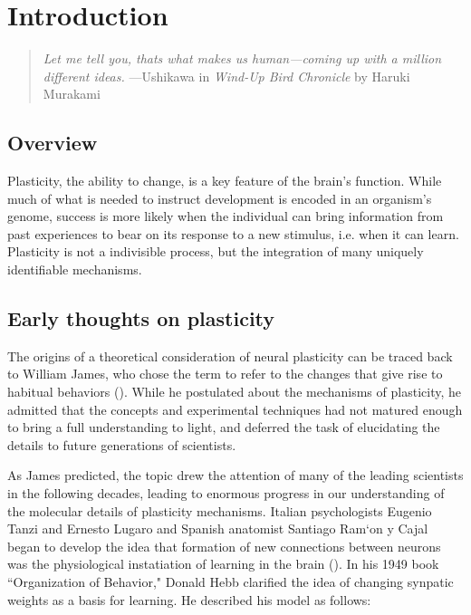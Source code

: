 \chapter{Introduction}

\begin{quotation}
\textit{Let me tell you, thats what makes us human---coming up with a million \mbox{different} ideas.}
\newline{}
\newline{}
 ---Ushikawa in \textit{Wind-Up Bird Chronicle} by Haruki Murakami
\end{quotation}

\section{Overview}

Plasticity, the ability to change, is a key feature of the brain's function. While much of what is needed to instruct development is encoded in an organism's genome, success is more likely when the individual can bring information from past experiences to bear on its response to a new stimulus, i.e. when it can learn. Plasticity is not a indivisible process, but the integration of many uniquely identifiable mechanisms.

\section{Early thoughts on plasticity}
The origins of a theoretical consideration of neural plasticity can be traced back to William James, who chose the term to refer to the changes that give rise to habitual behaviors (\cite{James1910, Berlucchi2009}). While he postulated about the mechanisms of plasticity, he admitted that the concepts and experimental techniques had not matured enough to bring a full understanding to light, and deferred the task of elucidating the details to future generations of scientists.

As James predicted, the topic drew the attention of many of the leading scientists in the following decades, leading to enormous progress in our understanding of the molecular details of plasticity mechanisms. Italian psychologists Eugenio Tanzi and Ernesto Lugaro and Spanish anatomist Santiago Ram\a`on y Cajal began to develop the idea that formation of new connections between neurons was the physiological instatiation of learning in the brain (\cite{Berlucchi2009}). In his 1949 book ``Organization of Behavior," Donald Hebb clarified the idea of changing synpatic weights as a basis for learning. He described his model as follows:

